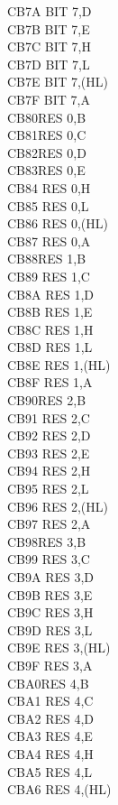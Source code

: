 \documentclass[12pt,twoside,openright,a4paper]{book}
\begin{document}
\begin{multicols}{3}
{\begin{tabbing}
	CB7A\> 	BIT 7,D\\
	CB7B\> 	BIT 7,E\\
	CB7C\> 	BIT 7,H\\
	CB7D\> 	BIT 7,L\\
	CB7E\> 	BIT 7,(HL)\\
	CB7F\> 	BIT 7,A\\
	CB80\>RES 0,B\\
	CB81\>RES 0,C\\
	CB82\>RES 0,D\\
	CB83\>RES 0,E\\
	CB84\> 	RES 0,H\\
	CB85\> 	RES 0,L\\
	CB86\> 	RES 0,(HL)\\
	CB87\> 	RES 0,A\\
	CB88\>RES 1,B\\
	CB89\> 	RES 1,C\\
	CB8A\> 	RES 1,D\\
	CB8B\> 	RES 1,E\\
	CB8C\> 	RES 1,H\\
	CB8D\> 	RES 1,L\\
	CB8E\> 	RES 1,(HL)\\
	CB8F\> 	RES 1,A\\
	CB90\>RES 2,B\\
	CB91\> 	RES 2,C\\
	CB92\> 	RES 2,D\\
	CB93\> 	RES 2,E\\
	CB94\> 	RES 2,H\\
	CB95\> 	RES 2,L\\
	CB96\> 	RES 2,(HL)\\
	CB97\> 	RES 2,A\\
	CB98\>RES 3,B\\
	CB99\> 	RES 3,C\\
	CB9A\> 	RES 3,D\\
	CB9B\> 	RES 3,E\\
	CB9C\> 	RES 3,H\\
	CB9D\> 	RES 3,L\\
	CB9E\> 	RES 3,(HL)\\
	CB9F\> 	RES 3,A\\
	CBA0\>RES 4,B\\
	CBA1\> 	RES 4,C\\
	CBA2\> 	RES 4,D\\
	CBA3\> 	RES 4,E\\
	CBA4\> 	RES 4,H\\
	CBA5\> 	RES 4,L\\
	CBA6\> 	RES 4,(HL)\\

\end{tabbing}}
\end{multicols}
\end{document}
